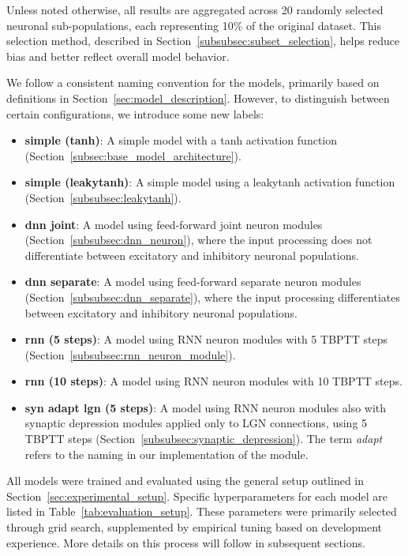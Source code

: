 Unless noted otherwise, all results are aggregated across 20 randomly selected neuronal sub-populations, each representing 10\% of the original dataset. This selection method, described in Section~\ref{subsubsec:subset_selection}, helps reduce bias and better reflect overall model behavior.

We follow a consistent naming convention for the models, primarily based on definitions in Section~\ref{sec:model_description}. However, to distinguish between certain configurations, we introduce some new labels:

\begin{itemize}
    \item \textbf{simple (tanh)}: A simple model with a tanh activation function (Section~\ref{subsec:base_model_architecture}).
    \item \textbf{simple (leakytanh)}: A simple model using a leakytanh activation function (Section~\ref{subsubsec:leakytanh}).
    \item \textbf{dnn joint}: A model using feed-forward joint neuron modules (Section~\ref{subsubsec:dnn_neuron}), where the input processing does not differentiate between excitatory and inhibitory neuronal populations.
    \item \textbf{dnn separate}: A model using feed-forward separate neuron modules  (Section~\ref{subsubsec:dnn_separate}), where the input processing differentiates between excitatory and inhibitory neuronal populations.
    \item \textbf{rnn (5 steps)}: A model using RNN neuron modules with 5 TBPTT steps (Section~\ref{subsubsec:rnn_neuron_module}).
    \item \textbf{rnn (10 steps)}: A model using RNN neuron modules with 10 TBPTT steps.
    \item \textbf{syn adapt lgn (5 steps)}: A model using RNN neuron modules also with synaptic depression modules applied only to LGN connections, using 5 TBPTT steps (Section~\ref{subsubsec:synaptic_depression}). The term \textit{adapt} refers to the naming in our implementation of the module.
\end{itemize}

All models were trained and evaluated using the general setup outlined in Section~\ref{sec:experimental_setup}. Specific hyperparameters for each model are listed in Table~\ref{tab:evaluation_setup}. These parameters were primarily selected through grid search, supplemented by empirical tuning based on development experience. More details on this process will follow in subsequent sections.

